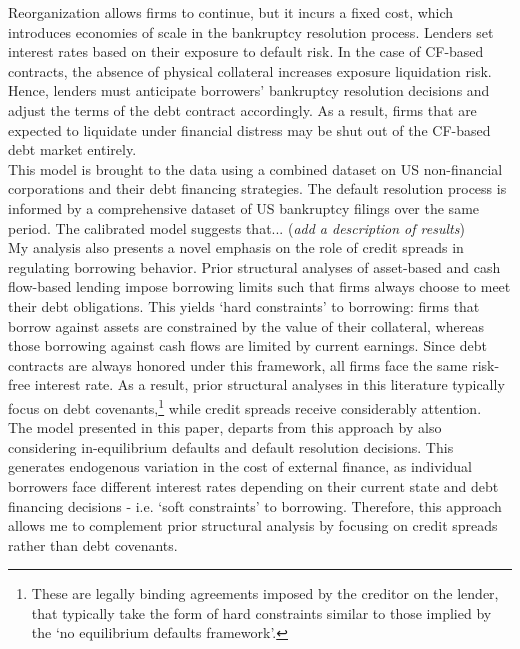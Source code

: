 \documentclass[12pt]{article}
\begin{document}
Reorganization allows firms to continue, but it incurs a fixed cost, which introduces economies of scale in the bankruptcy resolution process. Lenders set interest rates based on their exposure to default risk. In the case of CF-based contracts, the absence of physical collateral increases exposure liquidation risk. Hence, lenders must anticipate borrowers' bankruptcy resolution decisions and adjust the terms of the debt contract accordingly. As a result, firms that are expected to liquidate under financial distress may be shut out of the CF-based debt market entirely. \vspace{3mm} \\
This model is brought to the data using a combined dataset on US non-financial corporations and their debt financing strategies. The default resolution process is informed by a comprehensive dataset of US bankruptcy filings over the same period. The calibrated model suggests that... (\textit{add a description of results}) \vspace{3mm} \\
My analysis also presents a novel emphasis on the role of credit spreads in regulating borrowing behavior. Prior structural analyses of asset-based and cash flow-based lending impose borrowing limits such that firms always choose to meet their debt obligations. This yields `hard constraints' to borrowing: firms that borrow against assets are constrained by the value of their collateral, whereas those borrowing against cash flows are limited by current earnings. Since debt contracts are always honored under this framework, all firms face the same risk-free interest rate. As a result, prior structural analyses in this literature typically focus on debt covenants,\footnote{These are legally binding agreements imposed by the creditor on the lender, that typically take the form of hard constraints similar to those implied by the `no equilibrium defaults framework'.} while credit spreads receive considerably attention. \vspace{3mm} \\
The model presented in this paper, departs from this approach by also considering in-equilibrium defaults and default resolution decisions. This generates endogenous variation in the cost of external finance, as individual borrowers face different interest rates depending on their current state and debt financing decisions - i.e. `soft constraints' to borrowing. Therefore, this approach allows me to complement prior structural analysis by focusing on credit spreads rather than debt covenants. \vspace{3mm} \\
\end{document}
